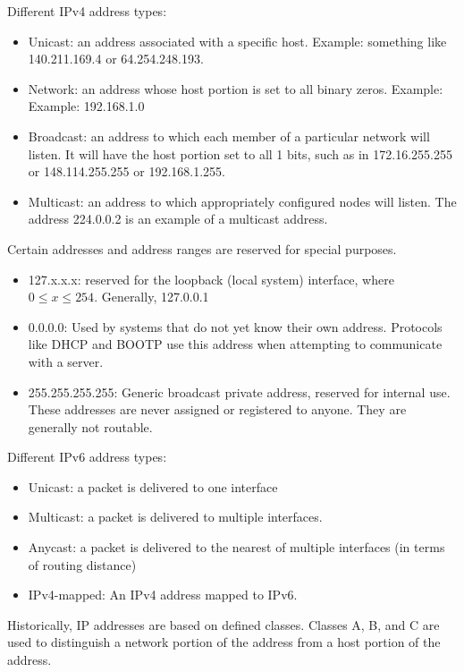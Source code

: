 \documentclass[11pt]{article}
\begin{document}
\noindent Different IPv4 address types:
\begin{itemize}
    \item[] Unicast: an address associated with a specific host. Example: something like 140.211.169.4 or 64.254.248.193. 
    \item[] Network: an address whose host portion is set to all binary zeros. Example: Example: 192.168.1.0
    \item[] Broadcast: an address to which each member of a particular network will listen. It will have the host portion set to all 1 bits, such as in 172.16.255.255 or 148.114.255.255 or 192.168.1.255.
    \item[] Multicast: an address to which appropriately configured nodes will listen. The address 224.0.0.2 is an example of a multicast address. 
\end{itemize}

\noindent Certain addresses and address ranges are reserved for special purposes.
\begin{itemize}
    \item[] 127.x.x.x: reserved for the loopback (local system) interface, where $0 \leq x \leq 254$. Generally, 127.0.0.1
    \item[] 0.0.0.0: Used by systems that do not yet know their own address. Protocols like DHCP and BOOTP use this address when attempting to communicate with a server.
    \item[] 255.255.255.255: Generic broadcast private address, reserved for internal use. These addresses are never assigned or registered to anyone. They are generally not routable.
\end{itemize}

\noindent Different IPv6 address types:
\begin{itemize}
    \item[] Unicast: a packet is delivered to one interface
    \item[] Multicast: a packet is delivered to multiple interfaces.
    \item[] Anycast: a packet is delivered to the nearest of multiple interfaces (in terms of routing distance)
    \item[] IPv4-mapped: An IPv4 address mapped to IPv6.
\end{itemize}

\noindent Historically, IP addresses are based on defined classes. Classes A, B, and C are used to distinguish a network portion of the address from a host portion of the address.
\end{document}
